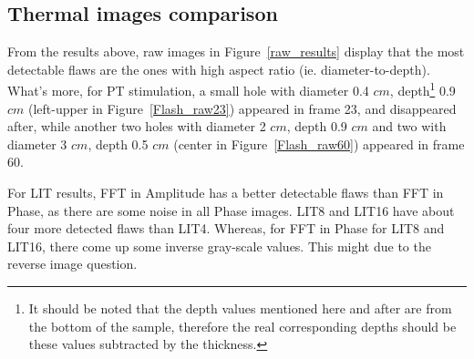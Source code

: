 \documentclass[]{spie}  %
\begin{document}
\subsection{Thermal images comparison} 

From the results above, raw images in Figure~\ref{raw_results} display that the most detectable flaws are the ones with high aspect ratio (ie. diameter-to-depth). What's more, for PT stimulation, a small hole with diameter 0.4 $cm$, depth\footnote{It should be noted that the depth values mentioned here and after are from the bottom of the sample, therefore the real corresponding depths should be these values subtracted by the thickness.} 0.9 $cm$ (left-upper in Figure~\ref{Flash_raw23}) appeared in frame 23, and disappeared after, while another two holes with diameter 2 $cm$, depth 0.9 $cm$ and two with diameter 3 $cm$, depth 0.5 $cm$ (center in Figure~\ref{Flash_raw60}) appeared in frame 60.  

For LIT results, FFT in Amplitude has a better detectable flaws than FFT in Phase, as there are some noise in all Phase images. LIT8 and LIT16 have about four more detected flaws than LIT4. Whereas, for FFT in Phase for LIT8 and LIT16, there come up some inverse gray-scale values. This might due to the reverse image question.
\end{document}
